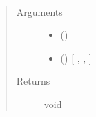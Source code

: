 \documentclass[a4paper,12pt,english]{sphinxmanual}
\begin{document}
\begin{fulllineitems}
\label{\detokenize{viewer/parameters:BIMDataViewer.setColor}}~\begin{quote}\begin{description}
\item[{Arguments}] \leavevmode\begin{itemize}
\item {} 
 () \textendash{} 

\item {} 
 () \textendash{} {[} , ,  {]}

\end{itemize}

\item[{Returns}] \leavevmode
void

\end{description}\end{quote}

\end{fulllineitems}
\end{document}
